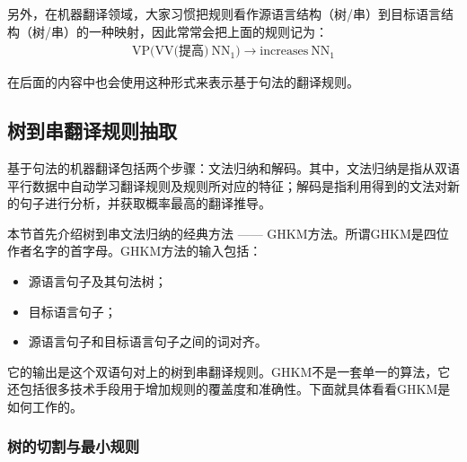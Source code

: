 \parinterval 另外，在机器翻译领域，大家习惯把规则看作源语言结构（树/串）到目标语言结构（树/串）的一种映射，因此常常会把上面的规则记为：
\begin{eqnarray}
\textrm{VP(VV(提高)}\ \textrm{NN}_1) \rightarrow \textrm{increases}\ \textrm{NN}_1 \nonumber
\end{eqnarray}

\parinterval 在后面的内容中也会使用这种形式来表示基于句法的翻译规则。


\subsection{树到串翻译规则抽取}

\parinterval 基于句法的机器翻译包括两个步骤：文法归纳和解码。其中，文法归纳是指从双语平行数据中自动学习翻译规则及规则所对应的特征；解码是指利用得到的文法对新的句子进行分析，并获取概率最高的翻译推导。

\parinterval 本节首先介绍树到串文法归纳的经典方法 —— GHKM方法\cite{galley2004s,galley2006scalable}。所谓GHKM是四位作者名字的首字母。GHKM方法的输入包括：

\begin{itemize}
\vspace{0.5em}
\item 源语言句子及其句法树；
\vspace{0.5em}
\item 目标语言句子；
\vspace{0.5em}
\item 源语言句子和目标语言句子之间的词对齐。
\vspace{0.5em}
\end{itemize}

\parinterval 它的输出是这个双语句对上的树到串翻译规则。GHKM不是一套单一的算法，它还包括很多技术手段用于增加规则的覆盖度和准确性。下面就具体看看GHKM是如何工作的。


\subsubsection{树的切割与最小规则}

